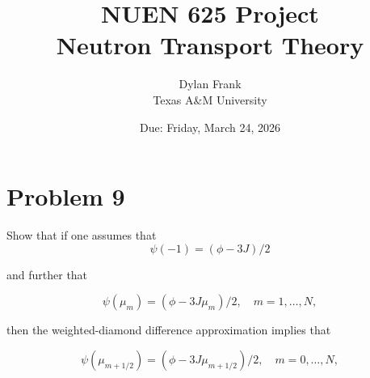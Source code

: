 \usepackage{fancyhdr}
\usepackage{titlesec}

\title{\vspace{2in}\textbf{NUEN 625 Project}\\\vspace{0.5in}\large Neutron Transport Theory}
\author{Dylan Frank\\Texas A\&M University}
\date{Due: Friday, March 24, 2026}



\maketitle
\thispagestyle{empty}
\newpage

\setcounter{page}{1}
\section*{Problem 9}

Show that if one assumes that
\begin{equation*}
  \psi(-1) = (\phi-3J)/2
\end{equation*}  

and further that

\begin{equation*}
  \psi(\mu_m) = (\phi-3J\mu_m)/2,\quad m=1,\dots, N,
\end{equation*}

then the weighted-diamond difference approximation implies that

\begin{equation*}
  \psi(\mu_{m+1/2}) = (\phi-3J\mu_{m+1/2})/2,\quad m=0,\dots, N,
\end{equation*}

